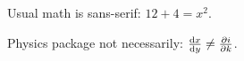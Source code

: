 \documentclass{beamer}
\begin{document}
    \begin{frame}
        Usual math is sans-serif: $12 + 4 = x^2$.

        Physics package not necessarily: $\dv{x}{y} \neq \pdv{i}{k}$.
    \end{frame}
\end{document}
